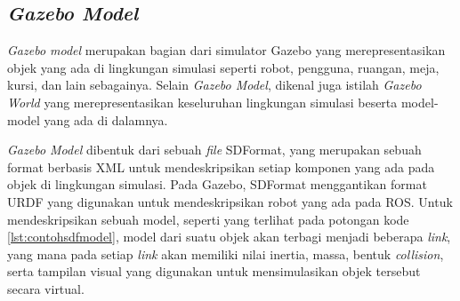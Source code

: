 \subsection{\emph{Gazebo Model}}
\label{subsec:gazebomodel}

\emph{Gazebo model} merupakan bagian dari simulator Gazebo yang merepresentasikan objek yang ada di lingkungan simulasi seperti robot, pengguna, ruangan, meja, kursi, dan lain sebagainya.
Selain \emph{Gazebo Model}, dikenal juga istilah \emph{Gazebo World} yang merepresentasikan keseluruhan lingkungan simulasi beserta model-model yang ada di dalamnya.



\emph{Gazebo Model} dibentuk dari sebuah \emph{file} SDFormat,
  yang merupakan sebuah format berbasis XML untuk mendeskripsikan setiap komponen yang ada pada objek di lingkungan simulasi.
Pada Gazebo, SDFormat menggantikan format URDF yang digunakan untuk mendeskripsikan robot yang ada pada ROS.
Untuk mendeskripsikan sebuah model,
  seperti yang terlihat pada potongan kode \ref{lst:contohsdfmodel},
  model dari suatu objek akan terbagi menjadi beberapa \emph{link},
  yang mana pada setiap \emph{link} akan memiliki nilai inertia, massa, bentuk \emph{collision}, serta tampilan visual yang digunakan untuk mensimulasikan objek tersebut secara virtual.
